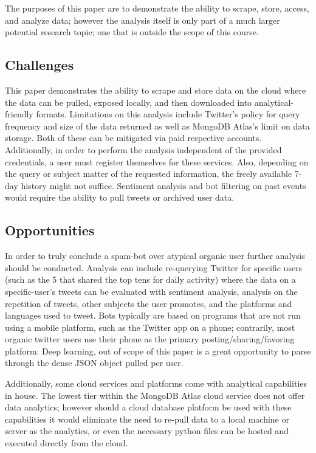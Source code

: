 The purposes of this paper are to demonstrate the ability to scrape, store,
access, and analyze data; however the analysis itself is only part of a much
larger potential research topic; one that is outside the scope of this course. 

\subsection{Challenges}

This paper demonstrates the ability to scrape and store data on the cloud where
the data can be pulled, exposed locally, and then downloaded into
analytical-friendly formats. Limitations on this analysis include Twitter's
policy for query frequency and size of the data returned as well as MongoDB
Atlas's limit on data storage. Both of these can be mitigated via paid
respective accounts. Additionally, in order to perform the analysis independent
of the provided credentials, a user must register themselves for these
services.  Also, depending on the query or subject matter of the requested
information, the freely available 7-day history might not suffice. Sentiment
analysis and bot filtering on past events would require the ability to pull
tweets or archived user data. 

\subsection{Opportunities}

In order to truly conclude a spam-bot over atypical organic user further
analysis should be conducted. Analysis can include re-querying Twitter for
specific users (such as the 5 that shared the top tens for daily activity)
where the data on a specific-user's tweets can be evaluated with sentiment
analysis, analysis on the repetition of tweets, other subjects the user
promotes, and the platforms and languages used to tweet. Bots typically are
based on programs that are not run using a mobile platform, such as the Twitter
app on a phone; contrarily, most organic twitter users use their phone as the
primary posting/sharing/favoring platform. Deep learning, out of scope of this
paper is a great opportunity to parse through the dense JSON object pulled per
user.

Additionally, some cloud services and platforms come with analytical
capabilities in house. The lowest tier within the MongoDB Atlas cloud service
does not offer data analytics; however should a cloud database platform be used
with these capabilities it would eliminate the need to re-pull data to a local
machine or server as the analytics, or even the necessary python files can be
hosted and executed directly from the cloud.

